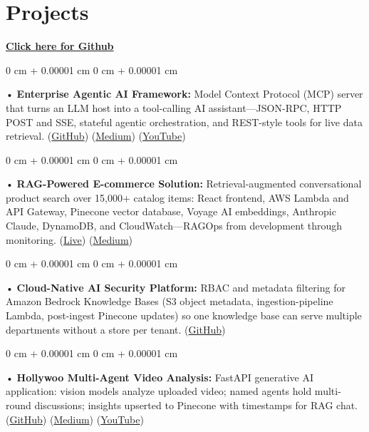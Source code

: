 \documentclass[10pt, letterpaper]{article}
\newenvironment{onecolentry}{
    \begin{adjustwidth}{
        0 cm + 0.00001 cm
    }{
        0 cm + 0.00001 cm
    }
}{
    \end{adjustwidth}
} %
\begin{document}
        \vspace{0.4cm}
\section{Projects}
    \vspace{2 pt}
\textbf{\href{https://github.com/daedalus-s}{Click here for Github}}
\begin{onecolentry}
     • \textbf{Enterprise Agentic AI Framework:} Model Context Protocol (MCP) server that turns an LLM host into a tool-calling AI assistant---JSON-RPC, HTTP POST and SSE, stateful agentic orchestration, and REST-style tools for live data retrieval. (\href{https://github.com/daedalus-s/dota2-mcp-server}{GitHub}) (\href{https://medium.com/@sreenikethaathreya/get-good-at-using-ai-noob-5d2576203112}{Medium}) (\href{https://www.youtube.com/watch?v=op2gTYyFb5U}{YouTube})
\end{onecolentry}
\begin{onecolentry}
     • \textbf{RAG-Powered E-commerce Solution:} Retrieval-augmented conversational product search over 15,000+ catalog items: React frontend, AWS Lambda and API Gateway, Pinecone vector database, Voyage AI embeddings, Anthropic Claude, DynamoDB, and CloudWatch---RAGOps from development through monitoring. (\href{https://prorecsa.co}{Live}) (\href{https://medium.com/@sreenikethaathreya/from-rags-to-riches-bba8a671d5e6}{Medium})
\end{onecolentry}
\begin{onecolentry}
     • \textbf{Cloud-Native AI Security Platform:} RBAC and metadata filtering for Amazon Bedrock Knowledge Bases (S3 object metadata, ingestion-pipeline Lambda, post-ingest Pinecone updates) so one knowledge base can serve multiple departments without a store per tenant. (\href{https://github.com/daedalus-s/bedrock-acl-metadata}{GitHub})
\end{onecolentry}
\begin{onecolentry}
     • \textbf{Hollywoo Multi-Agent Video Analysis:} FastAPI generative AI application: vision models analyze uploaded video; named agents hold multi-round discussions; insights upserted to Pinecone with timestamps for RAG chat. (\href{https://github.com/daedalus-s/fireworks-video-discussion}{GitHub}) (\href{https://medium.com/@sreenikethaathreya/hollywoo-ai-video-analysis-5eae37ca7e16}{Medium}) (\href{https://www.youtube.com/watch?v=KBs_3V0OAgU}{YouTube})
\end{onecolentry}
\vspace{2 pt}
        \vspace{2 pt }
\end{document}

